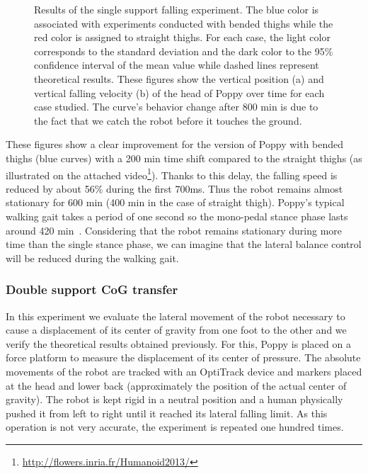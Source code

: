 \begin{figure}[h]
\centering
    \hfil
    \caption{Results of the single support falling experiment.
    The blue color is associated with experiments conducted with bended thighs while the red color is assigned to straight thighs.
    For each case, the light color corresponds to the standard deviation and the dark color to the 95\% confidence interval of the mean value while dashed lines represent theoretical results.
    These figures show the vertical position (a) and vertical falling velocity (b) of the head of Poppy over time for each case studied.
    The curve’s behavior change after 800 min is due to the fact that we catch the robot before it touches the ground.}
    \label{fig:falling_results}
\end{figure}

These figures show a clear improvement for the version of Poppy with bended thighs (blue curves) with a 200 min time shift compared to the straight thighs (as illustrated on the attached video\footnote{\url{http://flowers.inria.fr/Humanoid2013/}\label{video}}).
Thanks to this delay, the falling speed is reduced by about 56\% during the first 700ms. Thus the robot remains almost stationary for 600 min (400 min in the case of straight thigh).  Poppy’s typical walking gait  takes a period of one second so the mono-pedal stance phase lasts around 420 min~\parencite{lapeyre2013poppy}. Considering that the robot remains stationary during more time than the single stance phase, we can imagine that the lateral balance control will be reduced during the walking gait.



\subsubsection{Double support CoG transfer} %
\label{sub:cog_motion}


In this experiment we evaluate the lateral movement of the robot necessary to cause a displacement of its center of gravity from one foot to the other and we verify the theoretical results obtained previously. For this, Poppy is placed on a force platform to measure the displacement of its center of pressure. The absolute movements of the robot are tracked with an OptiTrack device and markers placed at the head and lower back (approximately the position of the actual center of gravity). The robot is kept rigid in a neutral position and a human physically pushed it from left to right until it reached its lateral falling limit. As this operation is not very accurate, the experiment is repeated one hundred times.

